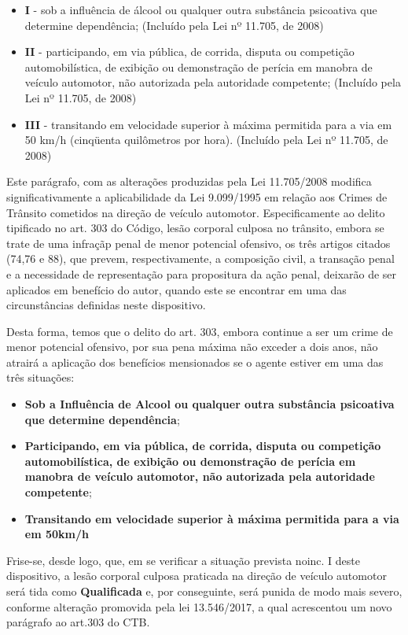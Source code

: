 \documentclass[
  letterpaper,
  DIV=11,
  numbers=noendperiod]{scrreport}
\providecommand{\tightlist}{%
  \setlength{\itemsep}{0pt}\setlength{\parskip}{0pt}}\usepackage{longtable,booktabs,array}
\begin{document}
\begin{itemize}
\item
  \textbf{I} - sob a influência de álcool ou qualquer outra substância
  psicoativa que determine dependência; (Incluído pela Lei nº 11.705, de
  2008)
\item
  \textbf{II} - participando, em via pública, de corrida, disputa ou
  competição automobilística, de exibição ou demonstração de perícia em
  manobra de veículo automotor, não autorizada pela autoridade
  competente; (Incluído pela Lei nº 11.705, de 2008)
\item
  \textbf{III} - transitando em velocidade superior à máxima permitida
  para a via em 50 km/h (cinqüenta quilômetros por hora). (Incluído pela
  Lei nº 11.705, de 2008)
\end{itemize}

Este parágrafo, com as alterações produzidas pela Lei 11.705/2008
modifica significativamente a aplicabilidade da Lei 9.099/1995 em
relação aos Crimes de Trânsito cometidos na direção de veículo
automotor. Especificamente ao delito tipificado no art. 303 do Código,
lesão corporal culposa no trânsito, embora se trate de uma infraçãp
penal de menor potencial ofensivo, os três artigos citados (74,76 e 88),
que prevem, respectivamente, a composição civil, a transação penal e a
necessidade de representação para propositura da ação penal, deixarão de
ser aplicados em benefício do autor, quando este se encontrar em uma das
circunstâncias definidas neste dispositivo.

Desta forma, temos que o delito do art. 303, embora continue a ser um
crime de menor potencial ofensivo, por sua pena máxima não exceder a
dois anos, não atrairá a aplicação dos benefícios mensionados se o
agente estiver em uma das três situações:

\begin{itemize}
\tightlist
\item
  \textbf{Sob a Influência de Alcool ou qualquer outra substância
  psicoativa que determine dependência};
\item
  \textbf{Participando, em via pública, de corrida, disputa ou
  competição automobilística, de exibição ou demonstração de perícia em
  manobra de veículo automotor, não autorizada pela autoridade
  competente};
\item
  \textbf{Transitando em velocidade superior à máxima permitida para a
  via em 50km/h}
\end{itemize}

Frise-se, desde logo, que, em se verificar a situação prevista noinc. I
deste dispositivo, a lesão corporal culposa praticada na direção de
veículo automotor será tida como \textbf{Qualificada} e, por
conseguinte, será punida de modo mais severo, conforme alteração
promovida pela lei 13.546/2017, a qual acrescentou um novo parágrafo ao
art.303 do CTB.
\end{document}
